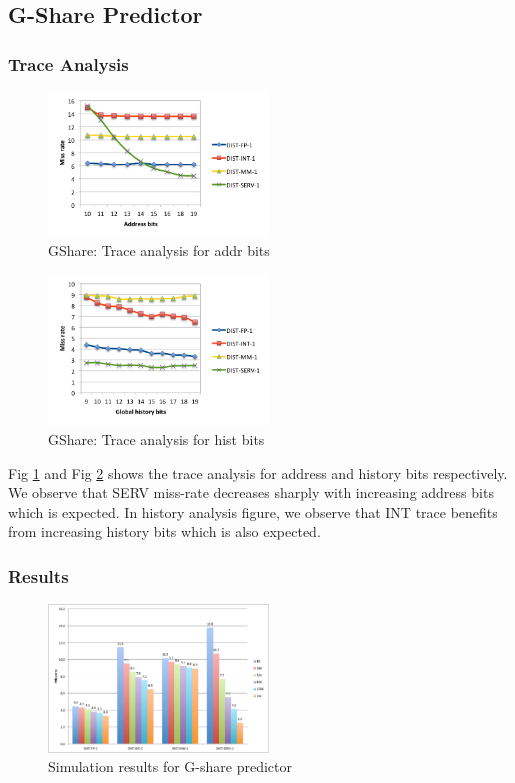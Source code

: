 \documentclass[conference]{IEEEtran}
\begin{document}
\subsection{G-Share Predictor}
\subsubsection{Trace Analysis}
\begin{figure}[!t]
    \centering
    \includegraphics[width=2.3in]{analysis_gshare_addr.png}
    \caption{GShare: Trace analysis for addr bits}
    \label{ana_gshare_addr}
\end{figure}
\begin{figure}[!t]
    \centering
    \includegraphics[width=2.3in]{analysis_gshare_hist.png}
    \caption{GShare: Trace analysis for hist bits}
    \label{ana_gshare_hist}
\end{figure}
Fig \ref{ana_gshare_addr} and Fig \ref{ana_gshare_hist} shows the trace analysis for address and history bits respectively. We observe that SERV miss-rate decreases sharply with increasing address bits which is expected. In history analysis figure, we observe that INT trace benefits from increasing history bits which is also expected.
\subsubsection{Results}


\begin{figure}[!t]
    \centering
    \includegraphics[width=2.3in]{gshare}
    \caption{Simulation results for G-share predictor}
    \label{results_ghsare}
\end{figure}
\end{document}
